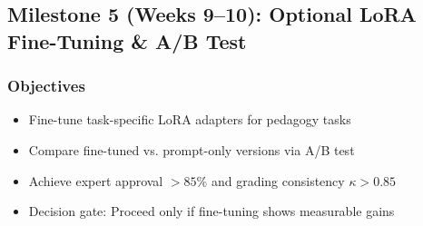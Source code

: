 \documentclass[11pt,letterpaper]{article}
\begin{document}
\subsection{Milestone 5 (Weeks 9--10): Optional LoRA Fine-Tuning \& A/B Test}\label{subsec:milestone-5}

\subsubsection{Objectives}
\begin{itemize}
\item Fine-tune task-specific LoRA adapters for pedagogy tasks
\item Compare fine-tuned vs. prompt-only versions via A/B test
\item Achieve expert approval $> 85\%$ and grading consistency $\kappa > 0.85$
\item Decision gate: Proceed only if fine-tuning shows measurable gains
\end{itemize}
\end{document}
